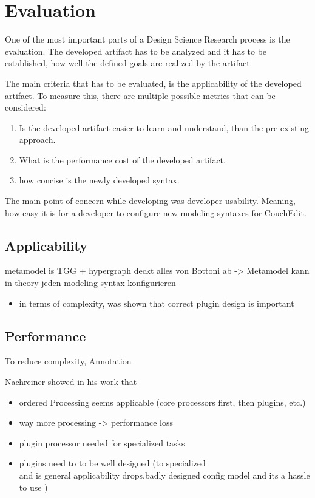 \chapter{Evaluation}
\label{chap:evaluation}
One of the most important parts of a Design Science Research process is the evaluation. The developed artifact has to be analyzed and it has to be established, how well the defined goals are realized by the artifact.

The main criteria that has to be evaluated, is the applicability of the developed artifact. To measure this, there are multiple possible metrics that can be considered:

\begin{enumerate}
  \item Is the developed artifact easier to learn and understand, than the pre existing approach.
  \item What is the performance cost of the developed artifact.
  \item how concise is the newly developed syntax.
\end{enumerate}

The main point of concern while developing was developer usability. Meaning, how easy it is for a developer to configure new modeling syntaxes for CouchEdit. 

\section{Applicability}
metamodel is TGG + hypergraph deckt alles von Bottoni ab -> Metamodel kann in theory jeden modeling syntax konfigurieren

\begin{itemize}
  \item in terms of complexity, was shown that correct plugin design is important
\end{itemize}


\section{Performance}
To reduce complexity, Annotation



Nachreiner showed in his work \cite{nachreiner_couchedit_2020} that 



\begin{itemize}
  \item ordered Processing seems applicable (core processors first, then plugins, etc.)
  \item way more processing -> performance loss
  \item plugin processor needed for specialized tasks
  \item plugins need to to be well designed (to specialized\\
        and is general applicability drops,badly designed config model and its a hassle to use )
\end{itemize}

